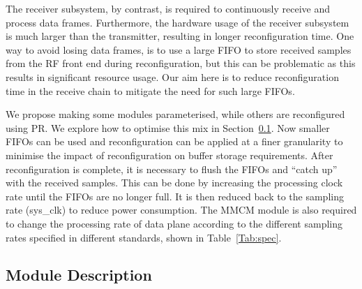 The receiver subsystem, by contrast, is required to continuously receive and process data frames.
Furthermore, the hardware usage of the receiver subsystem is much larger than the transmitter, resulting in longer reconfiguration time.
One way to avoid losing data frames, is to use a large FIFO to store received samples from the RF front end during reconfiguration, but this can be problematic as this results in significant resource usage.
Our aim here is to reduce reconfiguration time in the receive chain to mitigate the need for such large FIFOs.

We propose making some modules parameterised, while others are reconfigured using PR.
We explore how to optimise this mix in Section~\ref{sec:7module}.
Now smaller FIFOs can be used and reconfiguration can be applied at a finer granularity to minimise the impact of reconfiguration on buffer storage requirements.
After reconfiguration is complete, it is necessary to flush the FIFOs and ``catch up'' with the received samples.
This can be done by increasing the processing clock rate until the FIFOs are no longer full.
It is then reduced back to the sampling rate (sys\_clk) to reduce power consumption.
The MMCM module is also required to change the processing rate of data plane according to the different sampling rates specified in different standards, shown in Table~\ref{Tab:spec}.

\subsection{Module Description}\label{sec:7module}

